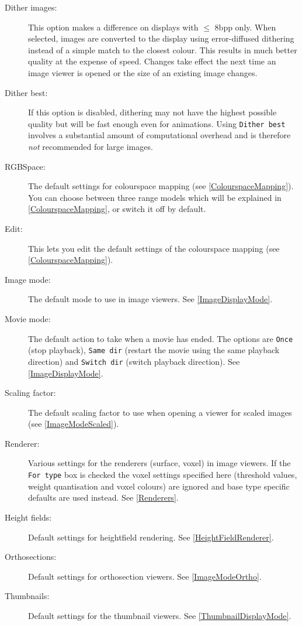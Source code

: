 \documentclass[11pt]{article}
\begin{document}
\begin{description}

\item[Dither images:] This option makes a difference on displays with $\le$ 8bpp only.
When selected, images are converted to the display using error-diffused dithering
instead of a simple match to the closest colour. This results in much better quality
at the expense of speed. Changes take effect the next time an image viewer is opened
or the size of an existing image changes.
\item[Dither best:] If this option is disabled, dithering may not have the highest
possible quality but will be fast enough even for animations. Using \texttt{Dither best}
involves a substantial amount of computational overhead and is therefore \emph{not}
recommended for large images.
\item[RGBSpace:] The default settings for colourspace mapping (see \ref{ColourspaceMapping}).
You can choose between three range models which will be explained in \ref{ColourspaceMapping},
or switch it off by default.
\item[Edit:] This lets you edit the default settings of the colourspace mapping
(see \ref{ColourspaceMapping}).

\item[Image mode:] The default mode to use in image viewers. See
\ref{ImageDisplayMode}.

\item[Movie mode:] The default action to take when a movie has ended. The options are
\texttt{Once} (stop playback), \texttt{Same dir} (restart the movie using the same playback
direction) and \texttt{Switch dir} (switch playback direction). See \ref{ImageDisplayMode}.

\item[Scaling factor:] The default scaling factor to use when opening a viewer for
scaled images (see \ref{ImageModeScaled}).

\item[Renderer:] Various settings for the renderers (surface, voxel) in image viewers.
If the \texttt{For type} box is checked the voxel settings specified here (threshold values,
weight quantisation and voxel colours) are ignored and base type specific defaults are used
instead. See \ref{Renderers}.

\item[Height fields:] Default settings for heightfield rendering. See
\ref{HeightFieldRenderer}.

\item[Orthosections:] Default settings for orthosection viewers. See
\ref{ImageModeOrtho}.

\item[Thumbnails:] Default settings for the thumbnail viewers. See
\ref{ThumbnailDisplayMode}.

\end{description}
\end{document}
